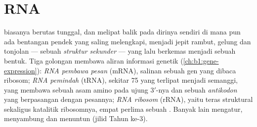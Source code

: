 \section{RNA}

\begin{definition}\label{def:b1:nucleic-acids:rnas}
 biasanya berutas tunggal, dan melipat balik pada dirinya sendiri di
mana pun ada bentangan pendek yang saling melengkapi, menjadi jepit
rambut, gelung dan tonjolan --- sebuah \emph{struktur sekunder} --- yang
lalu berkemas menjadi sebuah bentuk. Tiga golongan membawa aliran
informasi genetik (\cref{ch:b1:gene-expression}): \emph{RNA pembawa
pesan} (mRNA), salinan sebuah gen yang dibaca
ribosom; \emph{RNA pemindah} (tRNA), sekitar
\qty{75}{}  yang terlipat menjadi  semanggi, yang membawa
sebuah asam amino pada ujung $3'$-nya dan sebuah \emph{antikodon} yang
berpasangan dengan pesannya; \emph{RNA ribosom}
(rRNA), yaitu teras struktural sekaligus katalitik ribosomnya, empat
perlima  sebuah . Banyak  lain mengatur, menyambung dan
menuntun (jilid Tahun ke-3).
\end{definition}

